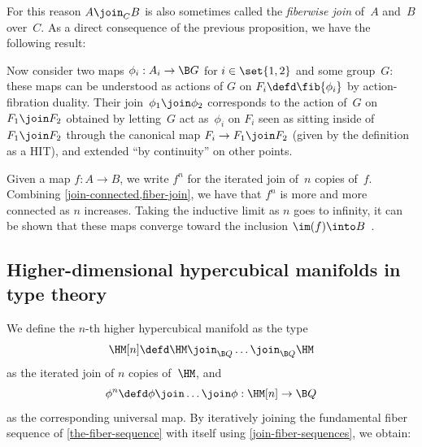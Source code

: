 \documentclass[a4paper]{article}
\begin{document}

\noindent
For this reason $A\join_CB$ is also sometimes called the \emph{fiberwise join} of~$A$ and~$B$ over~$C$.
As a direct consequence of the previous proposition, we have the following result:


Now consider two maps $\phi_i:A_i\to\B G$ for $i\in\set{1,2}$ and some group~$G$: these maps can be understood as actions of $G$ on $F_i\defd\fib{\phi_i}$ by action-fibration duality. Their join $\phi_1\join\phi_2$ corresponds to the action of~$G$ on $F_1\join F_2$ obtained by letting~$G$ act as $\phi_i$ on $F_i$ seen as sitting inside of $F_1\join F_2$ through the canonical map $F_i\to F_1\join F_2$ (given by the definition as a HIT), and extended ``by continuity'' on other points.

Given a map $f:A\to B$, we write $f^n$ for the iterated join of~$n$ copies of~$f$. Combining \cref{join-connected,fiber-join}, we have that $f^n$ is more and more connected as $n$ increases.
%
Taking the inductive limit as $n$ goes to infinity, it can be shown that these maps converge toward the inclusion $\im(f)\into B$~\cite[Theorem 4.2.13]{rijke2018classifying}.

\subsection{Higher-dimensional hypercubical manifolds in type theory}
We define the $n$-th higher hypercubical manifold as the type
\[
  \HM[n]
  \defd
  \HM\join_{\B Q}\ldots\join_{\B Q}\HM
\]
as the iterated join of $n$ copies of~$\HM$, and
\[
  \phi^n\defd\phi\join\ldots\join\phi:\HM[n]\to\B Q
\]
as the corresponding universal map. By iteratively joining the fundamental fiber sequence of \cref{the-fiber-sequence} with itself using \cref{join-fiber-sequences}, we obtain:
\end{document}
